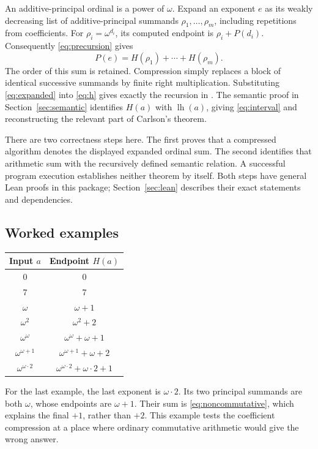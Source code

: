 \documentclass[11pt]{article}
\newcommand{\lh}{\operatorname{lh}}
\begin{document}
An additive-principal ordinal is a power of $\omega$. Expand an exponent
$e$ as its weakly decreasing list of additive-principal summands
$\rho_1,\ldots,\rho_m$, including repetitions from coefficients.
For $\rho_i=\omega^{d_i}$, its computed endpoint is
$\rho_i+P(d_i)$. Consequently \eqref{eq:precursion} gives
\begin{equation}\label{eq:expanded}
 P(e)=H(\rho_1)+\cdots+H(\rho_m).
\end{equation}
The order of this sum is retained. Compression simply replaces a block
of identical successive summands by finite right multiplication.
Substituting \eqref{eq:expanded} into \eqref{eq:h} gives exactly the
recursion in \cite[Proposition~1.1]{Wilken2021}. The semantic proof in
Section~\ref{sec:semantic} identifies $H(a)$ with $\lh(a)$, giving
\eqref{eq:interval} and reconstructing the relevant part of Carlson's theorem.

There are two correctness steps here. The first proves that a compressed
algorithm denotes the displayed expanded ordinal sum. The second
identifies that arithmetic sum with the recursively defined semantic
relation. A successful program execution establishes neither theorem
by itself. Both steps have general Lean proofs in this package;
Section~\ref{sec:lean} describes their exact statements and dependencies.

\subsection{Worked examples}

\begin{center}
\begin{tabular}{c|c}
Input $a$ & Endpoint $H(a)$\\\hline
$0$ & $0$\\
$7$ & $7$\\
$\omega$ & $\omega+1$\\
$\omega^2$ & $\omega^2+2$\\
$\omega^\omega$ & $\omega^\omega+\omega+1$\\
$\omega^{\omega+1}$ & $\omega^{\omega+1}+\omega+2$\\
$\omega^{\omega\cdot2}$ & $\omega^{\omega\cdot2}+\omega\cdot2+1$
\end{tabular}
\end{center}

For the last example, the last exponent is $\omega\cdot2$. Its two
principal summands are both $\omega$, whose endpoints are $\omega+1$.
Their sum is \eqref{eq:noncommutative}, which explains the final $+1$,
rather than $+2$. This example tests the coefficient compression at a
place where ordinary commutative arithmetic would give the wrong answer.
\end{document}
